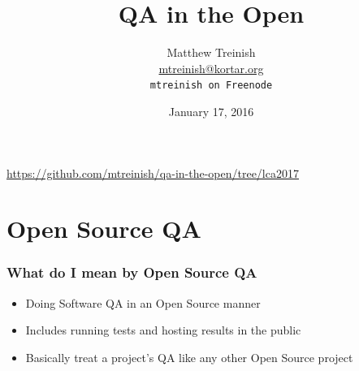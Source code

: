\documentclass[aspectratio=169,11pt,hyperref={colorlinks=true}]{beamer}
\author[Matthew Treinish]{%
    \texorpdfstring{%
        \centering
        Matthew Treinish\\
        \href{mailto:mtreinish@kortar.org}{mtreinish@kortar.org}\\
        \texttt{mtreinish on Freenode}
   }
   {Matthew Treinish}
}
\date{January 17, 2016}
\title[QA in the Open
\hspace{2em}\insertframenumber/\inserttotalframenumber]{QA in the Open}
\begin{document}
{%
\begin{frame}[noframenumbering]
    \hypersetup{colorlinks,urlcolor=white}
    \titlepage{}
    \centering
    \href{https://github.com/mtreinish/qa-in-the-open/tree/lca2017}{https://github.com/mtreinish/qa-in-the-open/tree/lca2017}
\end{frame}
}

\section{Open Source QA}
\begin{frame}
    \frametitle{What do I mean by Open Source QA}
    \begin{itemize}
        \item Doing Software QA in an Open Source manner
        \item Includes running tests and hosting results in the public
        \item Basically treat a project's QA like any other Open Source project
    \end{itemize}
\end{frame}
\end{document}
